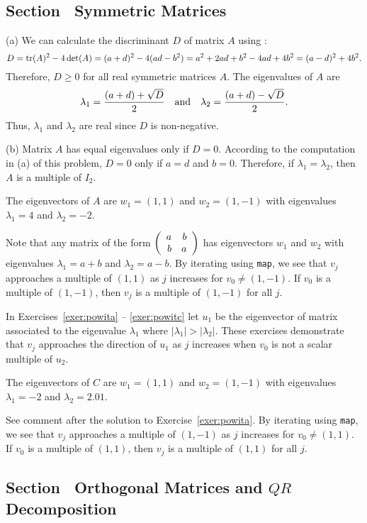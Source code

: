 \documentclass{ximera}
\begin{document}
\newpage
\subsection*{Section~\protect{\ref{S:symmetric}} Symmetric Matrices}

(a) We can calculate the discriminant $D$ of matrix $A$ using
:
\[ D = {\rm tr}(A)^2 - 4\det(A) = (a + d)^2 - 4(ad - b^2) =
a^2 + 2ad + b^2 - 4ad + 4b^2 = (a - d)^2 + 4b^2. \]
Therefore, $D \geq 0$ for all real symmetric matrices $A$.  The
eigenvalues of $A$ are
\[ \lambda_1 = \frac{(a + d) + \sqrt{D}}{2} \quad\mbox{and}\quad
\lambda_2 = \frac{(a + d) - \sqrt{D}}{2}. \]
Thus, $\lambda_1$ and $\lambda_2$ are real since $D$ is non-negative.

(b) Matrix $A$ has equal eigenvalues only if $D = 0$.  According to
the computation in (a) of this problem, $D = 0$ only if $a = d$ and
$b = 0$.  Therefore, if $\lambda_1 = \lambda_2$, then $A$ is a
multiple of $I_2$.

\ans The eigenvectors of $A$ are $w_1 = (1,1)$ and
$w_2 = (1,-1)$ with eigenvalues $\lambda_1 = 4$ and $\lambda_2 = -2$.  

\soln Note that any matrix of the form $\left(\begin{array}{rr} a & b\\ b &a\end{array}\right)$
has eigenvectors $w_1$ and $w_2$ with eigenvalues
$\lambda_1 = a + b$ and $\lambda_2 = a - b$.
By iterating using {\tt map}, we see that $v_j$ approaches a multiple
of $(1,1)$ as $j$ increases for $v_0 \neq (1,-1)$.  If $v_0$ is a
multiple of $(1,-1)$, then $v_j$ is a multiple of $(1,-1)$ for all $j$.

\para In Exercises~\ref{exer:powita} -- \ref{exer:powitc} let $u_1$ be the
eigenvector of matrix associated to the eigenvalue $\lambda_1$ where
$|\lambda_1| > |\lambda_2|$. These exercises demonstrate that $v_j$ 
approaches the direction of $u_1$ as $j$ increases when $v_0$ is
not a scalar multiple of $u_2$.

\ans The eigenvectors of $C$ are $w_1 = (1,1)$ and $w_2 = (1,-1)$ with 
eigenvalues $\lambda_1 = -2$ and $\lambda_2 = 2.01$.  

\soln See comment after the solution to Exercise~\ref{exer:powita}.
By iterating using {\tt map}, we see that $v_j$ approaches a multiple
of $(1,-1)$ as $j$ increases for $v_0 \neq (1,1)$.  If $v_0$ is a
multiple of $(1,1)$, then $v_j$ is a multiple of $(1,1)$ for all $j$.



\subsection*{Section~\protect{\ref{S:QR}} Orthogonal Matrices and $QR$
Decomposition}
\end{document}
